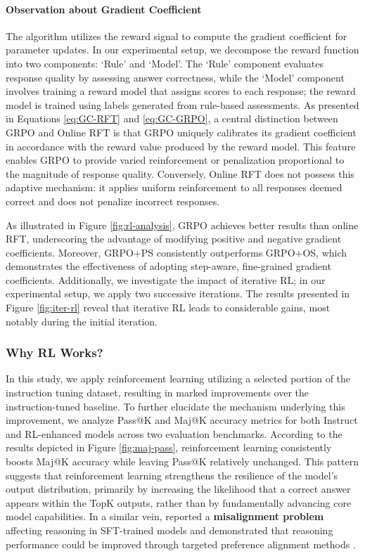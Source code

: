 \begin{itemize}[topsep=0pt]
\begin{itemize}[topsep=0pt]
\paragraph{Observation about Gradient Coefficient} The algorithm utilizes the reward signal to compute the gradient coefficient for parameter updates. In our experimental setup, we decompose the reward function into two components: `Rule' and `Model'. The `Rule' component evaluates response quality by assessing answer correctness, while the `Model' component involves training a reward model that assigns scores to each response; the reward model is trained using labels generated from rule-based assessments. As presented in Equations \ref{eq:GC-RFT} and \ref{eq:GC-GRPO}, a central distinction between GRPO and Online RFT is that GRPO uniquely calibrates its gradient coefficient in accordance with the reward value produced by the reward model. This feature enables GRPO to provide varied reinforcement or penalization proportional to the magnitude of response quality. Conversely, Online RFT does not possess this adaptive mechanism: it applies uniform reinforcement to all responses deemed correct and does not penalize incorrect responses.

As illustrated in Figure \ref{fig:rl-analysis}, GRPO achieves better results than online RFT, underscoring the advantage of modifying positive and negative gradient coefficients. Moreover, GRPO+PS consistently outperforms GRPO+OS, which demonstrates the effectiveness of adopting step-aware, fine-grained gradient coefficients. Additionally, we investigate the impact of iterative RL; in our experimental setup, we apply two successive iterations. The results presented in Figure \ref{fig:iter-rl} reveal that iterative RL leads to considerable gains, most notably during the initial iteration.

\subsubsection{Why RL Works?} In this study, we apply reinforcement learning utilizing a selected portion of the instruction tuning dataset, resulting in marked improvements over the instruction-tuned baseline. To further elucidate the mechanism underlying this improvement, we analyze Pass@K and Maj@K accuracy metrics for both Instruct and RL-enhanced models across two evaluation benchmarks. According to the results depicted in Figure \ref{fig:maj-pass}, reinforcement learning consistently boosts Maj@K accuracy while leaving Pass@K relatively unchanged. This pattern suggests that reinforcement learning strengthens the resilience of the model's output distribution, primarily by increasing the likelihood that a correct answer appears within the TopK outputs, rather than by fundamentally advancing core model capabilities. In a similar vein, \citep{wang2023making} reported a \textbf{misalignment problem} affecting reasoning in SFT-trained models and demonstrated that reasoning performance could be improved through targeted preference alignment methods \citep{yuan2023rrhf,song2023preference,wang2023making}.


\end{itemize}
\end{itemize}
